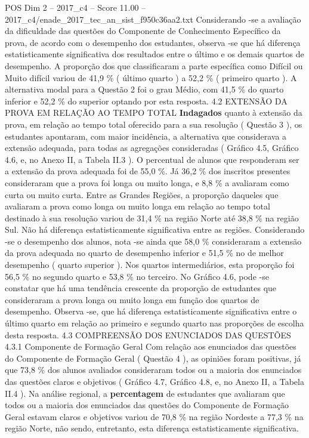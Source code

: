 \begin{textsample}{POS Dim 2 – 2017\_c4 – Score 11.00 – 2017\_c4/enade\_2017\_tec\_an\_sist\_f950c36aa2.txt}
Considerando -se a avaliação da dificuldade das questões do Componente de Conhecimento Específico da prova, de acordo com o desempenho dos estudantes, observa -se que há diferença estatisticamente significativa dos resultados entre o último e os demais quartos de desempenho.
A proporção dos que classificaram a parte específica como Difícil ou Muito difícil variou de 41,9 \% ( último quarto ) a 52,2 \% ( primeiro quarto ).
A alternativa modal para a Questão 2 foi o grau Médio, com 41,5 \% do quarto inferior e 52,2 \% do superior optando por esta resposta. 4.2 EXTENSÃO DA PROVA EM RELAÇÃO AO TEMPO TOTAL \textbf{Indagados} quanto à extensão da prova, em relação ao tempo total oferecido para a sua resolução ( Questão 3 ), os estudantes apontaram, com maior incidência, a alternativa que considerava a extensão adequada, para todas as agregações consideradas ( Gráfico 4.5, Gráfico 4.6, e, no Anexo II, a Tabela II.3 ).
O percentual de alunos que responderam ser a extensão da prova adequada foi de 55,0 \%.
Já 36,2 \% dos inscritos presentes consideraram que a prova foi longa ou muito longa, e 8,8 \% a avaliaram como curta ou muito curta.
Entre as Grandes Regiões, a proporção daqueles que avaliaram a prova como longa ou muito longa em relação ao tempo total destinado à sua resolução variou de 31,4 \% na região Norte até 38,8 \% na região Sul.
Não há diferença estatisticamente significativa entre as regiões.
Considerando -se o desempenho dos alunos, nota -se ainda que 58,0 \% consideraram a extensão da prova adequada no quarto de desempenho inferior e 51,5 \% no de melhor desempenho ( quarto superior ).
Nos quartos intermediários, esta proporção foi 56,5 \% no segundo quarto e 53,8 \% no terceiro.
No Gráfico 4.6, pode -se constatar que há uma tendência crescente da proporção de estudantes que consideraram a prova longa ou muito longa em função dos quartos de desempenho.
Observa -se, que há diferença estatisticamente significativa entre o último quarto em relação ao primeiro e segundo quarto nas proporções de escolha desta resposta. 4.3 COMPREENSÃO DOS ENUNCIADOS DAS QUESTÕES 4.3.1 Componente de Formação Geral Com relação aos enunciados das questões do Componente de Formação Geral ( Questão 4 ), as opiniões foram positivas, já que 73,8 \% dos alunos avaliados consideraram todos ou a maioria dos enunciados das questões claros e objetivos ( Gráfico 4.7, Gráfico 4.8, e, no Anexo II, a Tabela II.4 ).
Na análise regional, a \textbf{percentagem} de estudantes que avaliaram que todos ou a maioria dos enunciados das questões do Componente de Formação Geral estavam claros e objetivos variou de 70,8 \% na região Nordeste a 77,3 \% na região Norte, não sendo, entretanto, esta diferença estatisticamente significativa.

\end{textsample}
